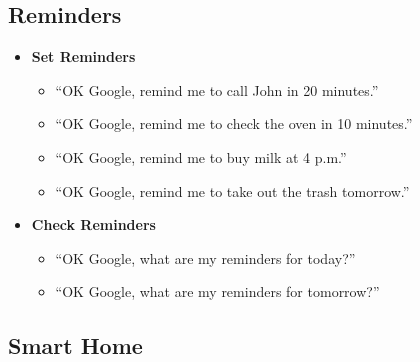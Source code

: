 \documentclass[
  jou,
  floatsintext,
  longtable,
  a4paper,
  nolmodern,
  notxfonts,
  notimes,
  colorlinks=true,linkcolor=blue,citecolor=blue,urlcolor=blue]{apa7}
\providecommand{\tightlist}{%
  \setlength{\itemsep}{0pt}\setlength{\parskip}{0pt}}
\begin{document}
\subsection{Reminders}\label{reminders}

\begin{itemize}
\tightlist
\item
  \textbf{Set Reminders}

  \begin{itemize}
  \tightlist
  \item
    ``OK Google, remind me to call John in 20 minutes.''
  \item
    ``OK Google, remind me to check the oven in 10 minutes.''
  \item
    ``OK Google, remind me to buy milk at 4 p.m.''
  \item
    ``OK Google, remind me to take out the trash tomorrow.''
  \end{itemize}
\item
  \textbf{Check Reminders}

  \begin{itemize}
  \tightlist
  \item
    ``OK Google, what are my reminders for today?''
  \item
    ``OK Google, what are my reminders for tomorrow?''
  \end{itemize}
\end{itemize}

\subsection{Smart Home}\label{smart-home}
\end{document}
